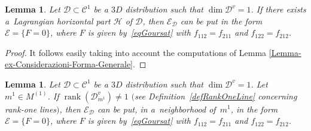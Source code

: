 \documentclass[pdftex]{sigma}
\newcommand{\E}{\mathcal{E}}
\newcommand{\rank}{\operatorname{rank}}
\numberwithin{equation}{section}
\newtheorem{Lemma}[Theorem]{Lemma}
\begin{document}
\begin{Lemma}\label{lemma.appoggio.gianni}
Let $\mathcal{D}\subset\mathcal{C}^1$ be a $3D$ distribution such that $\dim\mathcal{D}^v=1$. If there exists a~Lag\-rangian horizontal part $\mathcal{H}$ of $\mathcal{D}$, then $\mathcal{E}_{\mathcal D}$ can be put in the form $\E=\{F=0\}$, where $F$ is given by~\eqref{eqGoursat} with $f_{112}=f_{211}$ and $f_{122}=f_{212}$.
\end{Lemma}

\begin{proof}
It follows easily taking into account the computations of Lemma \ref{Lemma-ex-Considerazioni-Forma-Generale}.
\end{proof}

\begin{Lemma}\label{lemma.optimal}
Let $\mathcal{D}\subset\mathcal{C}^1$ be a $3D$ distribution such that $\dim\mathcal{D}^v=1$. Let $m^1\in M^{(1)}$. If $\rank(\mathcal{D}^v_{m^1})\neq 1$ $($see Definition~{\rm \ref{defRankOneLine}} concerning rank-one lines$)$, then $\mathcal{E}_{\mathcal D}$ can be put, in a~neighborhood of~$m^1$, in the form $\E=\{F=0\}$, where $F$ is given by~\eqref{eqGoursat} with $f_{112}=f_{211}$ and $f_{122}=f_{212}$.
\end{Lemma}
\end{document}
